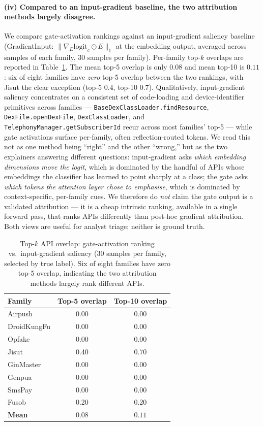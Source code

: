 \paragraph{(iv) Compared to an input-gradient baseline, the two
attribution methods largely disagree.} We compare gate-activation
rankings against an input-gradient saliency baseline
(GradientInput: $\|\nabla_E \mathrm{logit}_c \odot E\|_1$ at the
embedding output, averaged across samples of each family,
30 samples per family). Per-family top-$k$ overlaps
are reported in Table~\ref{tab:attrib-overlap}. The mean top-5
overlap is only $0.08$ and mean top-10 is $0.11$:
six of eight families have \emph{zero} top-5 overlap between the
two rankings, with Jisut the clear exception (top-5 $0.4$, top-10
$0.7$). Qualitatively, input-gradient saliency concentrates on
a consistent set of code-loading and device-identifier primitives
across families --- \texttt{BaseDexClassLoader.findResource},
\texttt{DexFile.openDexFile}, \texttt{DexClassLoader}, and
\texttt{TelephonyManager.getSubscriberId} recur across most
families' top-5 --- while gate activations surface per-family,
often reflection-routed tokens. We read this not as one method
being ``right'' and the other ``wrong,'' but as the two explainers
answering different questions: input-gradient asks \emph{which
embedding dimensions move the logit}, which is dominated by the
handful of APIs whose embeddings the classifier has learned to
point sharply at a class; the gate asks \emph{which tokens the
attention layer chose to emphasise}, which is dominated by
context-specific, per-family cues. We therefore do \emph{not}
claim the gate output is a validated attribution — it is a cheap
intrinsic ranking, available in a single forward pass, that ranks
APIs differently than post-hoc gradient attribution. Both views
are useful for analyst triage; neither is ground truth.

\begin{table}[htbp]
\centering
\caption{Top-$k$ API overlap: gate-activation ranking vs.\
input-gradient saliency (30 samples per family, selected by true
label). Six of eight families have zero top-5 overlap, indicating
the two attribution methods largely rank different APIs.}
\label{tab:attrib-overlap}
\small
\begin{tabular}{lcc}
\toprule
Family & Top-5 overlap & Top-10 overlap \\
\midrule
Airpush      & 0.00 & 0.00 \\
DroidKungFu  & 0.00 & 0.00 \\
Opfake       & 0.00 & 0.00 \\
Jisut        & 0.40 & 0.70 \\
GinMaster    & 0.00 & 0.00 \\
Genpua       & 0.00 & 0.00 \\
SmsPay       & 0.00 & 0.00 \\
Fusob        & 0.20 & 0.20 \\
\midrule
\textbf{Mean} & \textbf{$0.08$} & \textbf{$0.11$} \\
\bottomrule
\end{tabular}
\end{table}

